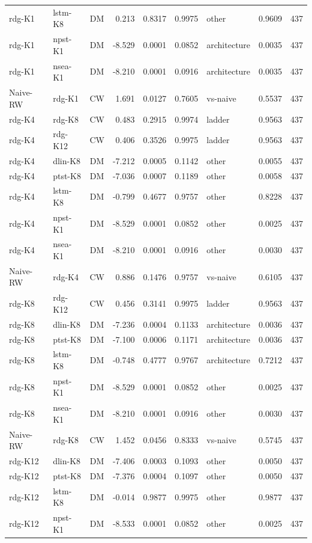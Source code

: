 \begin{table}[!t]
\begin{tabular}{llcrrrlrr}
rdg-K1 & lstm-K8 & DM & 0.213 & 0.8317 & 0.9975 & other & 0.9609 & 437 \\
rdg-K1 & npst-K1 & DM & -8.529 & 0.0001 & 0.0852 & architecture & 0.0035 & 437 \\
rdg-K1 & nsea-K1 & DM & -8.210 & 0.0001 & 0.0916 & architecture & 0.0035 & 437 \\
Naive-RW & rdg-K1 & CW & 1.691 & 0.0127 & 0.7605 & vs-naive & 0.5537 & 437 \\
rdg-K4 & rdg-K8 & CW & 0.483 & 0.2915 & 0.9974 & ladder & 0.9563 & 437 \\
rdg-K4 & rdg-K12 & CW & 0.406 & 0.3526 & 0.9975 & ladder & 0.9563 & 437 \\
rdg-K4 & dlin-K8 & DM & -7.212 & 0.0005 & 0.1142 & other & 0.0055 & 437 \\
rdg-K4 & ptst-K8 & DM & -7.036 & 0.0007 & 0.1189 & other & 0.0058 & 437 \\
rdg-K4 & lstm-K8 & DM & -0.799 & 0.4677 & 0.9757 & other & 0.8228 & 437 \\
rdg-K4 & npst-K1 & DM & -8.529 & 0.0001 & 0.0852 & other & 0.0025 & 437 \\
rdg-K4 & nsea-K1 & DM & -8.210 & 0.0001 & 0.0916 & other & 0.0030 & 437 \\
Naive-RW & rdg-K4 & CW & 0.886 & 0.1476 & 0.9757 & vs-naive & 0.6105 & 437 \\
rdg-K8 & rdg-K12 & CW & 0.456 & 0.3141 & 0.9975 & ladder & 0.9563 & 437 \\
rdg-K8 & dlin-K8 & DM & -7.236 & 0.0004 & 0.1133 & architecture & 0.0036 & 437 \\
rdg-K8 & ptst-K8 & DM & -7.100 & 0.0006 & 0.1171 & architecture & 0.0036 & 437 \\
rdg-K8 & lstm-K8 & DM & -0.748 & 0.4777 & 0.9767 & architecture & 0.7212 & 437 \\
rdg-K8 & npst-K1 & DM & -8.529 & 0.0001 & 0.0852 & other & 0.0025 & 437 \\
rdg-K8 & nsea-K1 & DM & -8.210 & 0.0001 & 0.0916 & other & 0.0030 & 437 \\
Naive-RW & rdg-K8 & CW & 1.452 & 0.0456 & 0.8333 & vs-naive & 0.5745 & 437 \\
rdg-K12 & dlin-K8 & DM & -7.406 & 0.0003 & 0.1093 & other & 0.0050 & 437 \\
rdg-K12 & ptst-K8 & DM & -7.376 & 0.0004 & 0.1097 & other & 0.0050 & 437 \\
rdg-K12 & lstm-K8 & DM & -0.014 & 0.9877 & 0.9975 & other & 0.9877 & 437 \\
rdg-K12 & npst-K1 & DM & -8.533 & 0.0001 & 0.0852 & other & 0.0025 & 437 \\

\end{tabular}
\end{table}
